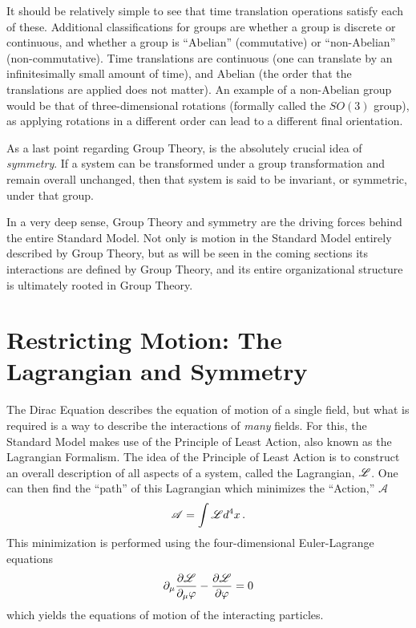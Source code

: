     It should be relatively simple to see that time translation operations satisfy each of these.
    Additional classifications for groups are whether a group is discrete or continuous,
        and whether a group is ``Abelian'' (commutative) or ``non-Abelian'' (non-commutative).
    Time translations are continuous (one can translate by an infinitesimally small amount of time),
        and Abelian (the order that the translations are applied does not matter).
    An example of a non-Abelian group would be that of three-dimensional rotations (formally called the $SO(3)$ group),
        as applying rotations in a different order can lead to a different final orientation.

    As a last point regarding Group Theory, is the absolutely crucial idea of \textit{symmetry}.
    If a system can be transformed under a group transformation and remain overall unchanged,
        then that system is said to be invariant, or symmetric, under that group.

    In a very deep sense, Group Theory and symmetry are the driving forces behind the entire Standard Model.
    Not only is motion in the Standard Model entirely described by Group Theory,
        but as will be seen in the coming sections its interactions are defined by Group Theory,
        and its entire organizational structure is ultimately rooted in Group Theory.


\section{Restricting Motion: The Lagrangian and Symmetry}\label{sec:symmetry}
    
    The Dirac Equation describes the equation of motion of a single field,
        but what is required is a way to describe the interactions of \textit{many} fields.
    For this, the Standard Model makes use of the Principle of Least Action,
        also known as the Lagrangian Formalism\cite{Halzen_book}.
    The idea of the Principle of Least Action is to construct an overall description of all aspects of a system,
        called the Lagrangian, $\mathscr{L}$.
    One can then find the ``path'' of this Lagrangian which minimizes the ``Action,'' $\mathscr{A}$
    \begin{equation} %
        \mathscr{A} = \int \Lag d^4 x
        \,.
    \end{equation}
    This minimization is performed using the four-dimensional Euler-Lagrange equations
    \begin{equation}
        \partial_\mu \frac{\partial \mathscr{L}}{\partial_\mu \varphi } - \frac{\partial \mathscr{L}}{\partial \varphi} = 0
    \end{equation}
    which yields the equations of motion of the interacting particles.

